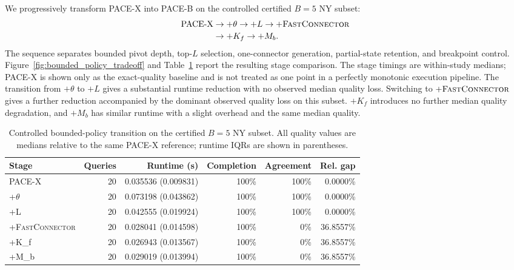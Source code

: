 \documentclass[a4paper,fleqn]{cas-dc}
\begin{document}
We progressively transform PACE-X into PACE-B on the controlled certified \(B=5\) NY subset:
\[
\begin{aligned}
\text{PACE-X}
&\rightarrow +\theta\rightarrow +L\rightarrow +\textsc{FastConnector}\\[-0.2ex]
&\rightarrow +K_f\rightarrow +M_b.
\end{aligned}
\]
The sequence separates bounded pivot depth, top-\(L\) selection, one-connector generation, partial-state retention, and breakpoint control. Figure~\ref{fig:bounded_policy_tradeoff} and Table~\ref{tab:bounded_policy} report the resulting stage comparison. The stage timings are within-study medians; PACE-X is shown only as the exact-quality baseline and is not treated as one point in a perfectly monotonic execution pipeline. The transition from \(+\theta\) to \(+L\) gives a substantial runtime reduction with no observed median quality loss. Switching to \(+\textsc{FastConnector}\) gives a further reduction accompanied by the dominant observed quality loss on this subset. \(+K_f\) introduces no further median quality degradation, and \(+M_b\) has similar runtime with a slight overhead and the same median quality.

\begin{table}[t]
\centering
\caption{Controlled bounded-policy transition on the certified \(B=5\) NY subset. All quality values are medians relative to the same PACE-X reference; runtime IQRs are shown in parentheses.}
\label{tab:bounded_policy}
\scriptsize
\setlength{\tabcolsep}{3pt}
\begin{tabular}{@{}lrrrrr@{}}
\toprule
\textbf{Stage} & \textbf{Queries} & \textbf{Runtime (s)} & \textbf{Completion} & \textbf{Agreement} & \textbf{Rel. gap} \\
\midrule
PACE-X & 20 & 0.035536 (0.009831) & 100\% & 100\% & 0.0000\% \\
+\(\theta\) & 20 & 0.073198 (0.043862) & 100\% & 100\% & 0.0000\% \\
+L & 20 & 0.042555 (0.019924) & 100\% & 100\% & 0.0000\% \\
+\textsc{FastConnector} & 20 & 0.028041 (0.014598) & 100\% & 0\% & 36.8557\% \\
+K_f & 20 & 0.026943 (0.013567) & 100\% & 0\% & 36.8557\% \\
+M_b & 20 & 0.029019 (0.013994) & 100\% & 0\% & 36.8557\% \\
\bottomrule
\end{tabular}
\end{table}
\end{document}
